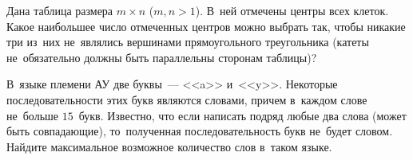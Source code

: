\begin{problems}
\item
Дана таблица размера $m \times n$ ($m, n > 1$).
В~ней отмечены центры всех клеток.
Какое наибольшее число отмеченных центров можно выбрать так, чтобы никакие три
из~них не~являлись вершинами прямоугольного треугольника
(катеты не~обязательно должны быть параллельны сторонам таблицы)?

\item
В~языке племени АУ две буквы~--- <<a>> и~<<y>>.
Некоторые последовательности этих букв являются словами, причем в~каждом слове
не~больше $15$~букв.
Известно, что если написать подряд любые два слова (может быть совпадающие),
то~полученная последовательность букв не~будет словом.
Найдите максимальное возможное количество слов в~таком языке.

\end{problems}

